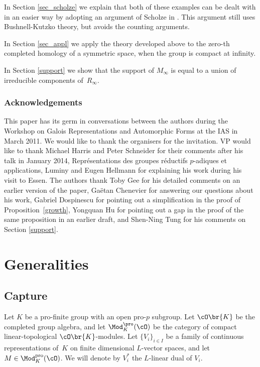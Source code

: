 In Section \ref{sec_scholze} we explain that both of these examples can be dealt with in an easier way
by adopting an argument of Scholze in \cite{scholze}. This argument still uses Bushnell-Kutzko theory, but avoids the counting arguments.

In Section \ref{sec_appl} we apply the theory developed above to the zero-th completed homology of a symmetric space, when the group is compact at infinity.

In Section \ref{support} we show that the support of $M_{\infty}$ is equal to a union of irreducible components of~$R_\infty$.

\subsubsection*{Acknowledgements} This paper has its germ in conversations between the authors during the Workshop on Galois Representations and Automorphic Forms at the IAS in March 2011.
We would like to thank the organisers for the invitation. VP would like to thank Michael Harris and Peter Schneider for their
comments after his talk in January 2014, Représentations des groupes réductifs $p$-adiques et applications, Luminy and Eugen Hellmann for explaining his work during his visit to Essen. The authors thank Toby Gee for his detailed comments on an earlier version of the paper, Gaëtan Chenevier for answering our questions about his work,
Gabriel Dospinescu for pointing out a simplification in the proof of Proposition~\ref{growth},
Yongquan Hu for pointing out a gap in the proof of the same proposition
in an earlier draft,
and Shen-Ning Tung for his comments on Section \ref{support}.

\section{Generalities}\label{generalities}

\subsection{Capture}\label{sec_capture}
Let $K$ be a pro-finite group with an open pro-$p$ subgroup.
Let $\cO\br{K}$ be the completed group algebra, and
let $\Mod^{\pro}_K(\cO)$ be the category of compact linear-topological $\cO\br{K}$-modules. Let $\{V_i\}_{i\in I}$ be a family of
continuous representations
of~$K$ on finite dimensional $L$-vector spaces, and let $M\in \Mod^{\mathrm{pro}}_K(\cO)$. We will denote by $V_i^*$ the $L$-linear dual of $V_i$.

